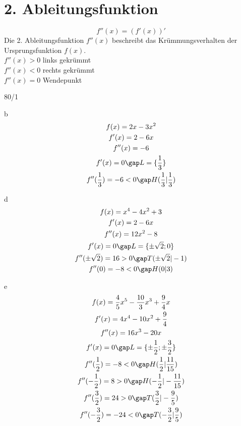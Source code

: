 \section{2. Ableitungsfunktion}
$$f''(x) = (f'(x))'$$
Die 2. Ableitungsfunktion $f''(x)$ beschreibt das Krümmungsverhalten der Ursprungsfunktion $f(x)$. \\
$f''(x) > 0$ links gekrümmt \\
$f''(x) < 0$ rechts gekrümmt \\
$f''(x) = 0$ Wendepunkt \\
\begin{exercise}{80/1}
  \item [b]
  \begin{gather*}
    f(x) = 2x - 3x^2 \\
    f'(x) = 2 - 6x \\
    f''(x) = -6 \\
    f'(x) = 0 \gap L = \{\frac{1}{3}\} \\
    f''(\frac{1}{3}) = -6 < 0 \gap H(\frac{1}{3}|\frac{1}{3})
  \end{gather*}
  \item [d]
  \begin{gather*}
    f(x) = x^4 - 4x^2 + 3 \\
    f'(x) = 2 - 6x \\
    f''(x) = 12x^2 - 8 \\
    f'(x) = 0 \gap L = \{\pm \sqrt{2}; 0\} \\
    f''(\pm \sqrt{2}) = 16 > 0 \gap T(\pm \sqrt{2}|-1) \\
    f''(0) = -8 < 0 \gap H(0|3)
  \end{gather*}
  \item [e]
  \begin{gather*}
    f(x) = \frac{4}{5}x^5 - \frac{10}{3}x^3 + \frac{9}{4}x \\
    f'(x) = 4x^4 - 10x^2 + \frac{9}{4} \\
    f''(x) = 16x^3 - 20x \\
    f'(x) = 0 \gap L = \{\pm \frac{1}{2}; \pm \frac{3}{2}\} \\
    f''(\frac{1}{2}) = -8 < 0 \gap H(\frac{1}{2}|\frac{11}{15}) \\
    f''(-\frac{1}{2}) = 8 > 0 \gap H(-\frac{1}{2}|-\frac{11}{15}) \\
    f''(\frac{3}{2}) = 24 > 0 \gap T(\frac{3}{2}|-\frac{9}{5}) \\
    f''(-\frac{3}{2}) = -24 < 0 \gap T(-\frac{3}{2}|\frac{9}{5})
  \end{gather*}
\end{exercise}
